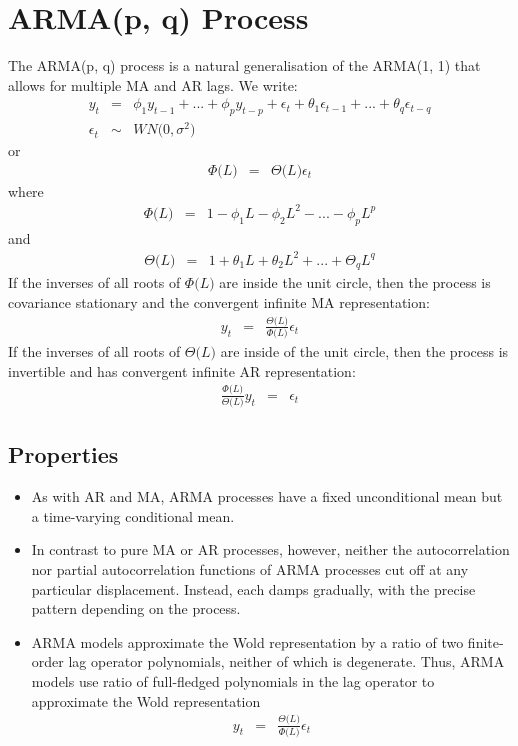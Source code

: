\section{ARMA(p, q) Process}
The ARMA(p, q) process is a natural generalisation of the ARMA(1, 1) that allows for multiple MA and AR lags. We write:
\begin{eqnarray}
	y_{t} &=& \phi_{1}y_{t - 1} + ... + \phi_{p}y_{t - p} + \epsilon_{t} +  \theta_{1}\epsilon_{t - 1} + ... + \theta_{q}\epsilon_{t - q}\\
	\epsilon_{t} &\sim& WN\Big(0, \sigma^{2}\Big)
\end{eqnarray}
or
\begin{eqnarray}
	\Phi\big(L\big) &=& \Theta\big(L\big)\epsilon_{t}
\end{eqnarray}
where
\begin{eqnarray}
	\Phi\big(L\big) &=& 1 - \phi_{1}L - \phi_{2}L^{2}- ... - \phi_{p}L^{p}
\end{eqnarray}
and
\begin{eqnarray}
	\Theta\big(L\big) &=& 1 + \theta_{1}L + \theta_{2}L^{2} + ... + \Theta_{q}L^{q}
\end{eqnarray}
If the inverses of all roots of $\Phi\big(L\big)$ are inside the unit circle, then the process is covariance stationary and the convergent infinite MA representation:
\begin{eqnarray}
	y_{t} &=& \frac{\Theta\big(L\big)}{\Phi\big(L\big)}\epsilon_{t}
\end{eqnarray}
If the inverses of all roots of $\Theta\big(L\big)$ are inside of the unit circle, then the process is invertible and has convergent infinite AR representation:
\begin{eqnarray}
	\frac{\Phi\big(L\big)}{\Theta\big(L\big)}y_{t} &=& \epsilon_{t}
\end{eqnarray}

\subsection{Properties}
\begin{itemize}
	\item As with AR and MA, ARMA processes have a fixed unconditional mean but a time-varying conditional mean.
	\item In contrast to pure MA or AR processes, however, neither the autocorrelation nor partial autocorrelation functions of ARMA processes cut off at any particular displacement. Instead, each damps gradually, with the precise pattern depending on the process.
	\item ARMA models approximate the Wold representation by a ratio of two finite-order lag operator polynomials, neither of which is degenerate. Thus, ARMA models use ratio of full-fledged polynomials in the lag operator to approximate the Wold representation
	\begin{eqnarray}
		y_{t} &=& \frac{\Theta\big(L\big)}{\Phi\big(L\big)}\epsilon_{t}
	\end{eqnarray}
\end{itemize}


